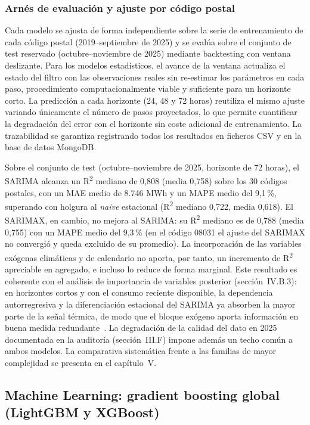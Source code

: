 \documentclass[12pt, a4paper]{article}
\begin{document}
\subsubsection{Arnés de evaluación y ajuste por código postal}

Cada modelo se ajusta de forma independiente sobre la serie de entrenamiento de cada código postal (2019--septiembre de 2025) y se evalúa sobre el conjunto de test reservado (octubre--noviembre de 2025) mediante backtesting con ventana deslizante. Para los modelos estadísticos, el avance de la ventana actualiza el estado del filtro con las observaciones reales sin re-estimar los parámetros en cada paso, procedimiento computacionalmente viable y suficiente para un horizonte corto. La predicción a cada horizonte (24, 48 y 72 horas) reutiliza el mismo ajuste variando únicamente el número de pasos proyectados, lo que permite cuantificar la degradación del error con el horizonte sin coste adicional de entrenamiento. La trazabilidad se garantiza registrando todos los resultados en ficheros CSV y en la base de datos MongoDB.

Sobre el conjunto de test (octubre--noviembre de 2025, horizonte de 72 horas), el SARIMA alcanza un R\textsuperscript{2} mediano de 0,808 (media 0,758) sobre los 30 códigos postales, con un MAE medio de 8.746 MWh y un MAPE medio del 9,1\,\%, superando con holgura al \textit{naive} estacional (R\textsuperscript{2} mediano 0,722, media 0,618). El SARIMAX, en cambio, no mejora al SARIMA: su R\textsuperscript{2} mediano es de 0,788 (media 0,755) con un MAPE medio del 9,3\,\% (en el código 08031 el ajuste del SARIMAX no convergió y queda excluido de su promedio). La incorporación de las variables exógenas climáticas y de calendario no aporta, por tanto, un incremento de R\textsuperscript{2} apreciable en agregado, e incluso lo reduce de forma marginal. Este resultado es coherente con el análisis de importancia de variables posterior (sección~IV.B.3): en horizontes cortos y con el consumo reciente disponible, la dependencia autorregresiva y la diferenciación estacional del SARIMA ya absorben la mayor parte de la señal térmica, de modo que el bloque exógeno aporta información en buena medida redundante~\cite{pardo2002}. La degradación de la calidad del dato en 2025 documentada en la auditoría (sección~III.F) impone además un techo común a ambos modelos. La comparativa sistemática frente a las familias de mayor complejidad se presenta en el capítulo~V.

\subsection{Machine Learning: gradient boosting global (LightGBM y XGBoost)}
\end{document}
